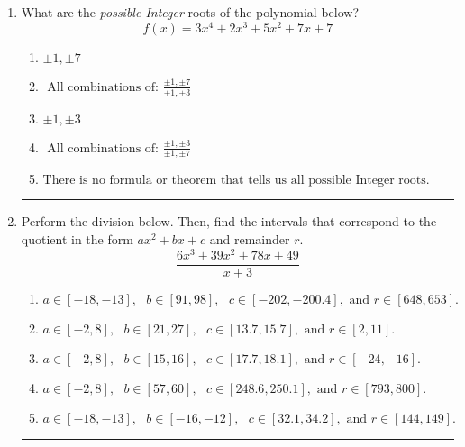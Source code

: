 \documentclass[14pt]{extbook}
\newcommand{\litem}[1]{\item#1\hspace*{-1cm}\rule{\textwidth}{0.4pt}}
\begin{document}
\begin{enumerate}
{\begin{enumerate}[label=\Alph*.]
\end{enumerate} }
\litem{
What are the \textit{possible Integer} roots of the polynomial below?\[ f(x) = 3x^{4} +2 x^{3} +5 x^{2} +7 x + 7 \]\begin{enumerate}[label=\Alph*.]
\item \( \pm 1,\pm 7 \)
\item \( \text{ All combinations of: }\frac{\pm 1,\pm 7}{\pm 1,\pm 3} \)
\item \( \pm 1,\pm 3 \)
\item \( \text{ All combinations of: }\frac{\pm 1,\pm 3}{\pm 1,\pm 7} \)
\item \( \text{There is no formula or theorem that tells us all possible Integer roots.} \)

\end{enumerate} }
\litem{
Perform the division below. Then, find the intervals that correspond to the quotient in the form $ax^2+bx+c$ and remainder $r$.\[ \frac{6x^{3} +39 x^{2} +78 x + 49}{x + 3} \]\begin{enumerate}[label=\Alph*.]
\item \( a \in [-18, -13], \text{   } b \in [91, 98], \text{   } c \in [-202, -200.4], \text{   and   } r \in [648, 653]. \)
\item \( a \in [-2, 8], \text{   } b \in [21, 27], \text{   } c \in [13.7, 15.7], \text{   and   } r \in [2, 11]. \)
\item \( a \in [-2, 8], \text{   } b \in [15, 16], \text{   } c \in [17.7, 18.1], \text{   and   } r \in [-24, -16]. \)
\item \( a \in [-2, 8], \text{   } b \in [57, 60], \text{   } c \in [248.6, 250.1], \text{   and   } r \in [793, 800]. \)
\item \( a \in [-18, -13], \text{   } b \in [-16, -12], \text{   } c \in [32.1, 34.2], \text{   and   } r \in [144, 149]. \)

\end{enumerate} }
\end{enumerate}
\end{document}

